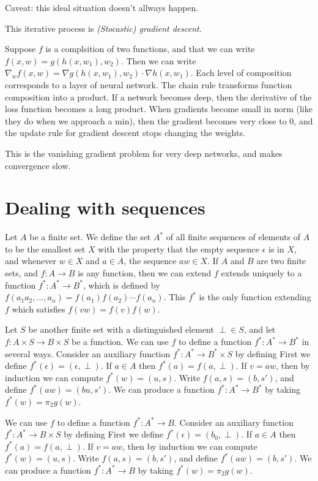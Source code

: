 \documentclass[10pt]{amsart}
\theoremstyle{definition}
\begin{document}
Caveat: this ideal situation doesn't allways happen.

This iterative process is {\em (Stocastic) gradient descent}.

Suppose $f$ is a complsition of two functions, and that we can write $f(x,w)= g(h(x, w_1), w_2)$.
Then we can write $\nabla_w f(x, w)=\nabla g(h(x, w_1), w_2)\cdot \nabla h(x, w_1)$. Each level
of composition corresponds to a layer of neural network.  The chain rule transforms function composition
into a product. If a network becomes deep, then the derivative of the loss function becomes a long
product.  When gradients become small in norm (like they do when we approach a min), then the gradient
becomes very close to $0$, and the update rule for gradient descent stops changing the weights.

This is the vanishing gradient problem for very deep networks, and makes convergence slow.

\section{Dealing with sequences}

Let $A$ be a finite set. We define the set $A^*$ of all finite sequences of elements of $A$ to be the smallest set $X$ with the property that the empty sequence $\epsilon$ is in $X$, and whenever $w\in X$ and $a\in A$, the sequence $aw\in X$. If $A$ and $B$ are two finite sets, and $f:A\to B$ is any function, then we can extend $f$ extends uniquely to a function $f^*:A^*\to B^*$, which is defined by $f(a_1a_2,...,a_n)=f(a_1)f(a_2)\cdots f(a_n)$. This $f^*$ is the only function extending $f$ which satisfies $f(vw)=f(v)f(w)$.

Let $S$ be another finite set with a distinguished element $\perp\in S$, and let $f:A\times S\to B\times S$ be a function. We can use $f$ to define a function $f^*:A^*\to B^*$ in several ways. Consider an auxiliary function $f^*:A^*\to B^*\times S$ by defining First we define $f^*(\epsilon)=(\epsilon, \perp)$. If $a\in A$ then $f^*(a)=f(a, \perp)$. If $v=aw$, then by induction we can compute $f^*(w)=(u, s)$. Write $f(a, s)=(b, s')$, and define $f^*(aw)=(bu, s')$.  We can produce a function $f^*:A^*\to B^*$ by taking $f^*(w)=\pi_2 g(w)$.

We can use $f$ to define a function $f^*:A^*\to B$. Consider an auxiliary function $f^*:A^*\to B\times S$ by defining First we define $f^*(\epsilon)=(b_0, \perp)$. If $a\in A$ then $f^*(a)=f(a, \perp)$. If $v=aw$, then by induction we can compute $f^*(w)=(u, s)$. Write $f(a, s)=(b, s')$, and define $f^*(aw)=(b, s')$.  We can produce a function $f^*:A^*\to B$ by taking $f^*(w)=\pi_2 g(w)$.
\end{document}
